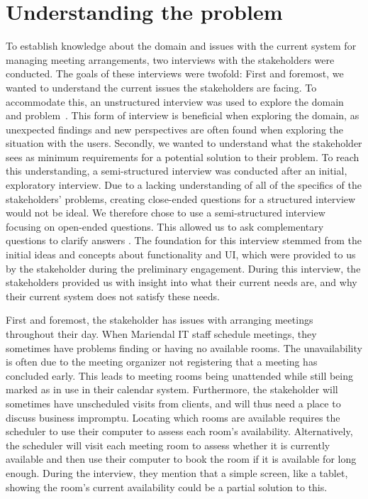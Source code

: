 \section{Understanding the problem}\label{sec:understanding_the_problem} %
To establish knowledge about the domain and issues with the current system for managing meeting arrangements, two interviews with the stakeholders were conducted. 
The goals of these interviews were twofold: 
First and foremost, we wanted to understand the current issues the stakeholders are facing. 
To accommodate this, an unstructured interview was used to explore the domain and problem~\cite{benyon2013designing}. 
This form of interview is beneficial when exploring the domain, as unexpected findings and new perspectives are often found when exploring the situation with the users\cite{benyon2013designing}.
Secondly, we wanted to understand what the stakeholder sees as minimum requirements for a potential solution to their problem. 
To reach this understanding, a semi-structured interview was conducted after an initial, exploratory interview.
Due to a lacking understanding of all of the specifics of the stakeholders' problems, creating close-ended questions for a structured interview would not be ideal.
We therefore chose to use a semi-structured interview focusing on open-ended questions. This allowed us to ask complementary questions to clarify answers \cite{InterviewsNHS}.
The foundation for this interview stemmed from the initial ideas and concepts about functionality and UI, which were provided to us by the stakeholder during the preliminary engagement.
During this interview, the stakeholders provided us with insight into what their current needs are, and why their current system does not satisfy these needs.

First and foremost, the stakeholder has issues with arranging meetings throughout their day.
When Mariendal IT staff schedule meetings, they sometimes have problems finding or having no available rooms.
The unavailability is often due to the meeting organizer not registering that a meeting has concluded early.
This leads to meeting rooms being unattended while still being marked as in use in their calendar system.
Furthermore, the stakeholder will sometimes have unscheduled visits from clients, and will thus need a place to discuss business impromptu. 
Locating which rooms are available requires the scheduler to use their computer to assess each room's availability.
Alternatively, the scheduler will visit each meeting room to assess whether it is currently available and then use their computer to book the room if it is available for long enough.
During the interview, they mention that a simple screen, like a tablet, showing the room's current availability could be a partial solution to this.

